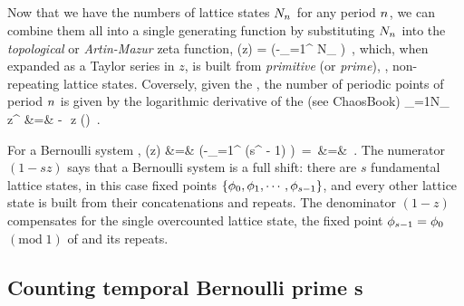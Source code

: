 \subsection{\Tzeta}
\label{s:bernZeta}

Now that we have the numbers of lattice states $N_{{n_{}}}$ for any
period ${n_{}}$, we can combine them all into a single generating function by
substituting $N_{{n_{}}}$ into the {\em topological} or {\em Artin-Mazur}
zeta func\-tion,
\beq
\zetatop(z) =
     \exp\left(-\sum_{\cl{}=1}^\infty
{} N_\cl{}
         \right)
\,,
which, when expanded as a Taylor series in $z$, is built from
\emph{primitive} (or \emph{prime}), \ie, non-repeating lattice
states. Coversely, given the \tzeta, the number of periodic
points of period $\cl{}$ is given by the logarithmic derivative of the
{\tzeta} (see
{ChaosBook})
\bea
\sum_{\cl{}=1}N_\cl{} z^\cl{}
    &=& - \,\,z (\zetatop)
\,.
\label{zetatop-N}
\eea

For a Bernoulli system ,
\bea
\zetatop(z)
 &=&  \exp \left(-\sum_{\cl{}=1}^\infty
{} ({s}^\cl{} - 1)
         \right)
\,=\,
\exp \left[\ln(1 -  {s}z) - \ln(1 - z) \right]
\continue
 &=&
\,.
\label{BernZeta}
\eea
The numerator $(1 - {s}z)$ says that a Bernoulli system is a full
shift: there are $s$ fundamental lattice states, in this case
fixed points $\{\phi_0,\phi_1,\cdots,\phi_{s-1}\}$, and every other
lattice state is built from their concatenations and repeats. The
denominator $(1 - z)$ compensates for the single overcounted lattice
state, the fixed point $\phi_{{s}-1}=\phi_{0}$ $(\mbox{mod}\;1)$ of
 and its repeats.

\subsection{Counting temporal Bernoulli prime \po s}
\label{s:bernPrime}

